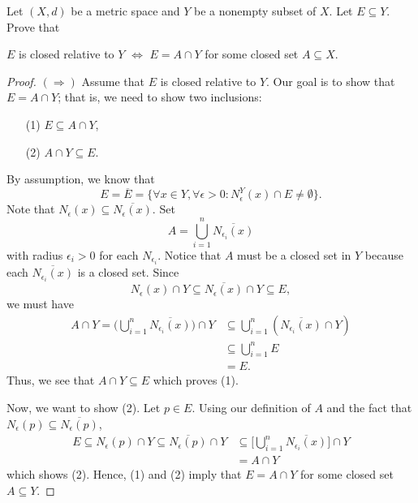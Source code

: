 \documentclass[a4paper]{article}
\begin{document}
   \begin{problem}
      Let \( (X,d) \) be a metric space and \( Y  \) be a nonempty subset of \( X  \). Let \( E \subseteq Y \). Prove that   
      \begin{center}
          \( E  \) is closed relative to \( Y  \) \( \iff \) \( E = A \cap Y  \) for some closed set \( A \subseteq  X \).
      \end{center}
   \end{problem} 
   \begin{proof}
    \( (\Longrightarrow) \) Assume that \( E  \) is closed relative to \( Y  \). Our goal is to show that \( E = A \cap Y  \); that is, we need to show two inclusions:
    \begin{enumerate}
        \item[(1)] \( E \subseteq A \cap Y  \),
        \item[(2)] \( A \cap Y \subseteq E  \).
    \end{enumerate}
    By assumption, we know that 
    \[  E = \overline{E} = \{ \forall x \in Y, \forall \epsilon > 0 : {N}_{\epsilon}^{Y}(x) \cap E \neq \emptyset \}. \]
    Note that \( {N}_{\epsilon}(x) \subseteq  \overline{{N}_{\epsilon}(x)} \). Set 
    \[  A = \bigcup_{ i=1 }^{ n } \overline{{N}_{{\epsilon}_{i}}(x)}  \]
    with radius \( {\epsilon}_{i} > 0  \) for each \( {N}_{{\epsilon}_{i}} \). Notice that \( A  \) must be a closed set in \( Y  \) because each \( \overline{{N}_{{\epsilon}_{i}}(x)} \) is a closed set. Since 
    \[ {N}_{\epsilon}(x) \cap Y \subseteq  \overline{{N}_{\epsilon}(x)} \cap Y \subseteq E,   \]
    we must have 
    \begin{align*}
        A \cap Y = \Big(  \bigcup_{ i=1  }^{ n }  \overline{{N}_{{\epsilon}_{i}}(x)}  \Big) \cap Y &\subseteq \bigcup_{ i=1 }^{ n } (\overline{{N}_{{\epsilon}_{i}}(x)} \cap Y)  \\
                                                                                                   &\subseteq \bigcup_{ i=1 }^{ n }  E \\
                                                                                                   &= E.
    \end{align*}
    Thus, we see that \( A \cap Y \subseteq E   \) which proves (1).

    Now, we want to show (2). Let \( p \in E  \). Using our definition of \( A  \) and the fact that \( {N}_{\epsilon}(p) \subseteq \overline{{N}_{\epsilon}(p)} \), 
    \begin{align*}
        E \subseteq  {N}_{\epsilon}(p) \cap Y \subseteq \overline{{N}_{\epsilon}(p)} \cap Y &\subseteq \Big[ \bigcup_{ i=1  }^{ n }  \overline{{N}_{{\epsilon}_{i}}(x)}\Big] \cap Y   \\
                                                                                            &= A \cap Y
    \end{align*}
    which shows (2). Hence, (1) and (2) imply that \( E = A \cap Y  \) for some closed set \( A \subseteq  Y \).


\end{proof}
\end{document}

